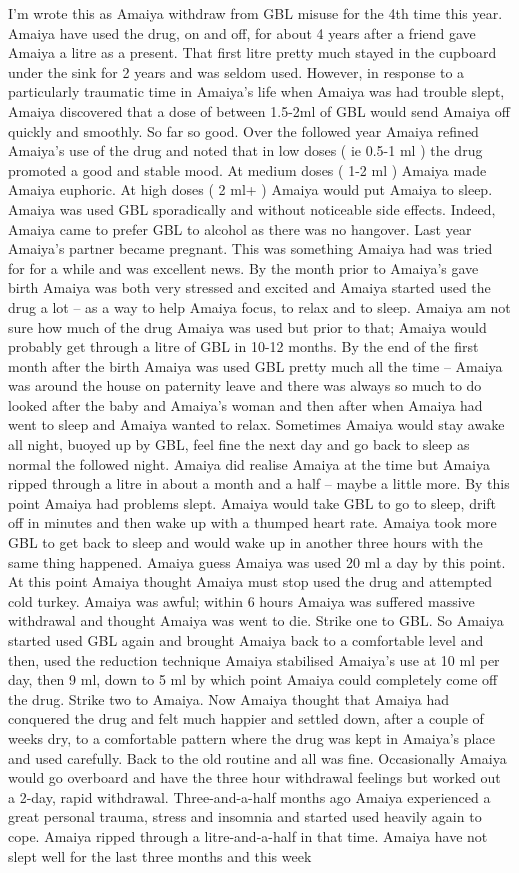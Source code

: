 \documentclass[12pt]{book}
\begin{document}
I'm wrote this as Amaiya withdraw from GBL misuse for the 4th time this year. Amaiya have used the drug, on and off, for about 4 years after a friend gave Amaiya a litre as a present. That first litre pretty much stayed in the cupboard under the sink for 2 years and was seldom used. However, in response to a particularly traumatic time in Amaiya's life when Amaiya was had trouble slept, Amaiya discovered that a dose of between 1.5-2ml of GBL would send Amaiya off quickly and smoothly. So far so good. Over the followed year Amaiya refined Amaiya's use of the drug and noted that in low doses ( ie 0.5-1 ml ) the drug promoted a good and stable mood. At medium doses ( 1-2 ml ) Amaiya made Amaiya euphoric. At high doses ( 2 ml+ ) Amaiya would put Amaiya to sleep. Amaiya was used GBL sporadically and without noticeable side effects. Indeed, Amaiya came to prefer GBL to alcohol as there was no hangover. Last year Amaiya's partner became pregnant. This was something Amaiya had was tried for for a while and was excellent news. By the month prior to Amaiya's gave birth Amaiya was both very stressed and excited and Amaiya started used the drug a lot -- as a way to help Amaiya focus, to relax and to sleep. Amaiya am not sure how much of the drug Amaiya was used but prior to that; Amaiya would probably get through a litre of GBL in 10-12 months. By the end of the first month after the birth Amaiya was used GBL pretty much all the time -- Amaiya was around the house on paternity leave and there was always so much to do looked after the baby and Amaiya's woman and then after when Amaiya had went to sleep and Amaiya wanted to relax. Sometimes Amaiya would stay awake all night, buoyed up by GBL, feel fine the next day and go back to sleep as normal the followed night. Amaiya did realise Amaiya at the time but Amaiya ripped through a litre in about a month and a half -- maybe a little more. By this point Amaiya had problems slept. Amaiya would take GBL to go to sleep, drift off in minutes and then wake up with a thumped heart rate. Amaiya took more GBL to get back to sleep and would wake up in another three hours with the same thing happened. Amaiya guess Amaiya was used 20 ml a day by this point. At this point Amaiya thought Amaiya must stop used the drug and attempted cold turkey. Amaiya was awful; within 6 hours Amaiya was suffered massive withdrawal and thought Amaiya was went to die. Strike one to GBL. So Amaiya started used GBL again and brought Amaiya back to a comfortable level and then, used the reduction technique Amaiya stabilised Amaiya's use at 10 ml per day, then 9 ml, down to 5 ml by which point Amaiya could completely come off the drug. Strike two to Amaiya. Now Amaiya thought that Amaiya had conquered the drug and felt much happier and settled down, after a couple of weeks dry, to a comfortable pattern where the drug was kept in Amaiya's place and used carefully. Back to the old routine and all was fine. Occasionally Amaiya would go overboard and have the three hour withdrawal feelings but worked out a 2-day, rapid withdrawal. Three-and-a-half months ago Amaiya experienced a great personal trauma, stress and insomnia and started used heavily again to cope. Amaiya ripped through a litre-and-a-half in that time. Amaiya have not slept well for the last three months and this week 
\end{document}
